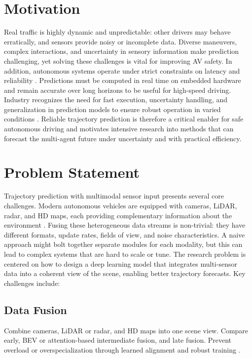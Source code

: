 \documentclass[12pt,a4paper]{report}
\begin{document}
\section{Motivation}
\quad Real traffic is highly dynamic and unpredictable: other drivers may behave erratically, and sensors provide noisy or incomplete data. Diverse maneuvers, complex interactions, and uncertainty in sensory information make prediction challenging, yet solving these challenges is vital for improving AV safety. In addition, autonomous systems operate under strict constraints on latency and reliability \cite{huang2022survey}. Predictions must be computed in real time on embedded hardware and remain accurate over long horizons to be useful for high-speed driving. Industry recognizes the need for fast execution, uncertainty handling, and generalization in prediction models to ensure robust operation in varied conditions \cite{Ettinger2021WOMD,Wayformer2022,ISO21448}. Reliable trajectory prediction is therefore a critical enabler for safe autonomous driving and motivates intensive research into methods that can forecast the multi-agent future under uncertainty and with practical efficiency.


\section{Problem Statement}

\quad Trajectory prediction with multimodal sensor input presents several core challenges. Modern autonomous vehicles are equipped with cameras, LiDAR, radar, and HD maps, each providing complementary information about the environment \cite{madjid2025survey}. Fusing these heterogeneous data streams is non-trivial: they have different formats, update rates, fields of view, and noise characteristics. A naive approach might bolt together separate modules for each modality, but this can lead to complex systems that are hard to scale or tune. The research problem is centered on how to design a deep learning model that integrates multi-sensor data into a coherent view of the scene, enabling better trajectory forecasts. Key challenges include:

\subsection{Data Fusion}
\quad Combine cameras, LiDAR or radar, and HD maps into one scene view. Compare early, BEV or attention-based intermediate fusion, and late fusion. Prevent overload or overspecialization through learned alignment and robust training \cite{madjid2025survey}.
\end{document}
